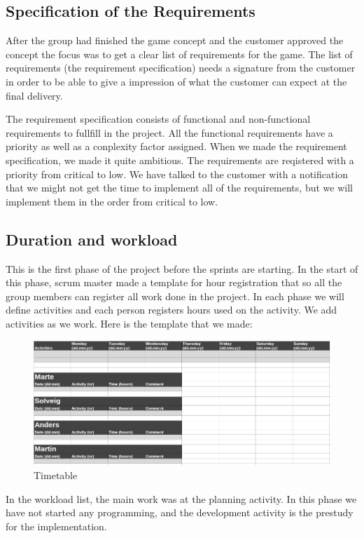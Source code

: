 \subsection{Specification of the Requirements}
	After the group had finished the game concept and the customer approved the concept the
	focus was to get a clear list of requirements for the game. The list of requirements 
	(the requirement specification) needs a signature from the customer in order to be able
	to give a impression of what the customer can expect at the final delivery.

	The requirement specification consists of functional and non-functional requirements to
	fullfill in the project. All the functional requirements have a priority as well as a 
	conplexity factor assigned. When we made the requirement specification, we made it quite 
	ambitious. The requirements are reqistered with a priority from critical to low. We have
	talked to the customer with a notification that we might not get the time to implement all
	of the requirements, but we will implement them in the order from critical to low. 

\subsection{Duration and workload}
	This is the first phase of the project before the sprints are starting. In the start of 
	this phase, scrum master made a template for hour registration that so all the group members
	can register all work done in the project. In each phase we will define activities and each
	person registers hours used on the activity. We add activities as we work. Here is the template 
	that we made:

	\begin{figure}
		\includegraphics[width=\textwidth]{pictures/timetable.png}
		\caption{Timetable}
	\end{figure}

	In the workload list, the main work was at the planning activity. In this phase we have
	not started any programming, and the development activity is the prestudy for the implementation.

